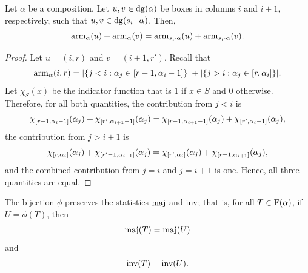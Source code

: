 \begin{lemma} \label{lem:arm-cancelation}
    Let \(\alpha\) be a composition.
    Let \(u, v \in \dg(\alpha)\) be boxes in columns \(i\) and \(i+1\), respectively, such that \(u, v \in \dg(s_i \permact \alpha)\).
    Then,
    \begin{equation*}
        \operatorname{arm}_{\alpha}(u) + \operatorname{arm}_{\alpha}(v)
        =
        \operatorname{arm}_{s_i \cdot \alpha}(u) + \operatorname{arm}_{s_i \cdot \alpha}(v).
    \end{equation*}
\end{lemma}
\begin{proof}
    Let \(u = (i, r)\) and \(v = (i+1, r')\).
    Recall that 
    \begin{equation*}
        \operatorname{arm}_{\alpha}(i, r) = |\{j < i : \alpha_j \in [r-1, \alpha_i - 1]\}| + |\{j > i : \alpha_j \in [r, \alpha_i]\}|.
    \end{equation*}
    Let \(\chi_S(x)\) be the indicator function that is \(1\) if \(x \in S\) and \(0\) otherwise.
    Therefore, for all both quantities, the contribution from \(j < i\) is
    \begin{equation*}
        \chi_{[r-1, \alpha_i - 1]}(\alpha_j) + \chi_{[r', \alpha_{i+1} - 1]}(\alpha_j) =
        \chi_{[r-1, \alpha_{i+1} - 1]}(\alpha_j) + \chi_{[r', \alpha_i - 1]}(\alpha_j),
    \end{equation*}
    the contribution from \(j > i+1\) is
    \begin{equation*}
        \chi_{[r, \alpha_i]}(\alpha_j) + \chi_{[r' - 1, \alpha_{i+1}]}(\alpha_j) =
        \chi_{[r', \alpha_i]}(\alpha_j) + \chi_{[r - 1, \alpha_{i+1}]}(\alpha_j),
    \end{equation*}
    and the combined contribution from \(j = i\) and \(j = i+1\) is one.
    Hence, all three quantities are equal.
\end{proof}

\begin{theorem} \label{thm:phi-maj-inv}
    The bijection \(\phi\) preserves the statistics \(\maj\) and \(\inv\); that is, for all \(T \in \Fill(\alpha)\), if \(U = \phi(T)\), then
    \begin{equation} \label{eq:phi-maj}
        \maj(T) = \maj(U)
    \end{equation}
    and
    \begin{equation} \label{eq:phi-inv}
        \inv(T) = \inv(U).
    \end{equation}
\end{theorem}

